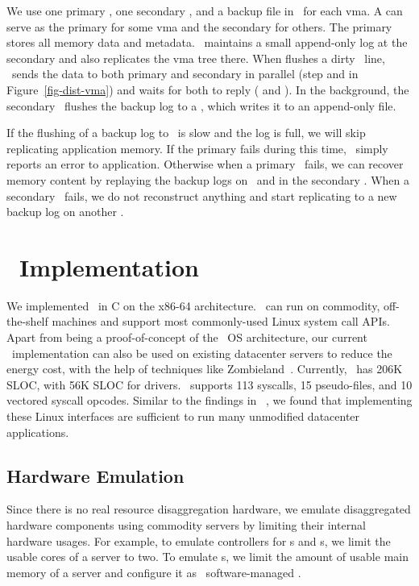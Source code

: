 \documentclass[10pt,times,twocolumn]{z2-article}
\newcommand*\circled[1]{\tikz[baseline=-3pt]{
            \node[shape=circle,draw,inner sep=1pt,minimum size=10pt] (char) {\small #1};}}
\begin{document}
{{{{{{{We use one primary \mcomponent, one secondary \mcomponent, and a backup file in \scomponent\ for each vma.
A \mcomponent{} can serve as the primary for some vma and the secondary for others.
The primary stores all memory data and metadata. %
\lego\ maintains a small append-only log at the secondary \mcomponent{}
and also replicates the vma tree there.
When \pcomponent{} flushes a dirty \excache\ line, 
\lego\ sends the data to both primary and secondary in parallel (step \circled{a} and \circled{b} in Figure~\ref{fig-dist-vma})
and waits for both to reply (\circled{c} and \circled{d}).
In the background, the secondary \mcomponent\ flushes the backup log to a \scomponent{},
which writes it to an append-only file.

If the flushing of a backup log to \scomponent\ is slow and the log is full, 
we will skip replicating application memory.
If the primary fails during this time, \lego\ simply reports an error to application.
Otherwise when a primary \mcomponent\ fails, we can recover memory content 
by replaying the backup logs on \scomponent\ and in the secondary \mcomponent.
When a secondary \mcomponent\ fails, we do not reconstruct anything 
and start replicating to a new backup log on another \mcomponent{}.

\section{\lego\ Implementation}
\label{sec:impl}

We implemented \lego\ in C on the x86-64 architecture.
\lego\ can run on commodity, off-the-shelf machines 
and support most commonly-used Linux system call APIs.
Apart from being a proof-of-concept of the \splitkernel\ OS architecture,
our current \lego\ implementation can also be used on existing datacenter servers to reduce the energy cost,
with the help of techniques like Zombieland~\cite{Nitu18-EUROSYS}.
Currently, \lego\ has 206K SLOC,
with 56K SLOC for drivers.
\lego\ supports 113 syscalls, 15 pseudo-files,
and 10 vectored syscall opcodes. 
Similar to the findings in ~\cite{tsai-eurosys16}, we found that implementing these Linux interfaces
are sufficient to run many unmodified datacenter applications.

\subsection{Hardware Emulation}
Since there is no real resource disaggregation hardware,
we emulate disaggregated hardware components using commodity servers 
by limiting their internal hardware usages.
For example, to emulate controllers for \mcomponent{}s and \scomponent{}s, 
we limit the usable cores of a server to two.
To emulate \pcomponent{}s, we limit the amount of usable main memory of a server
and configure it as \lego\ software-managed \excache.

}}}}}}}
\end{document}
